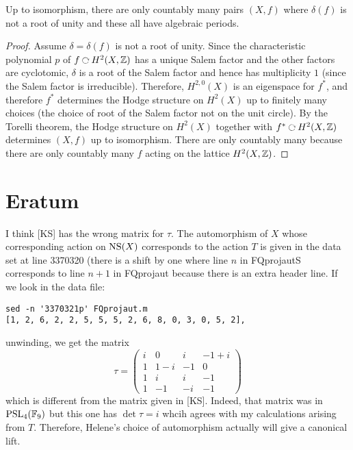 \documentclass[12pt]{article}
\begin{document}
\begin{theorem}
Up to isomorphism, there are only countably many pairs $(X, f)$ where $\delta(f)$ is not a root of unity and these all have algebraic periods.
\end{theorem}

\begin{proof}
Assume $\delta = \delta(f)$ is not a root of unity. Since the characteristic polynomial $p$ of $f \acts H^2(X, \Z)$ has a unique Salem factor and the other factors are cyclotomic, $\delta$ is a root of the Salem factor and hence has multiplicity $1$ (since the Salem factor is irreducible). Therefore, $H^{2,0}(X)$ is an eigenspace for $f^*$, and therefore $f^*$ determines the Hodge structure on $H^2(X)$ up to finitely many choices (the choice of root of the Salem factor not on the unit circle). By the Torelli theorem, the Hodge structure on $H^2(X)$ together with $f^* \acts H^2(X, \Z)$ determines $(X, f)$ up to isomorphism. There are only countably many because there are only countably many $f$ acting on the lattice $H^2(X, \mathbb{Z})$.  
\end{proof}

\section{Eratum}

I think [KS] has the wrong matrix for $\tau$. The automorphism of $X$ whose corresponding action on $\operatorname{\mathrm{NS}}(X)$ corresponds to the action $T$ is given in the data set at line 3370320 (there is a shift by one where line $n$ in FQprojautS corresponds to line $n+1$ in FQprojaut because there is an extra header line. If we look in the data file:
\begin{verbatim}
sed -n '3370321p' FQprojaut.m
[1, 2, 6, 2, 2, 5, 5, 5, 2, 6, 8, 0, 3, 0, 5, 2], 
\end{verbatim}
unwinding, we get the matrix
\[ 
\tau = 
\begin{pmatrix}
i & 0 & i & -1 + i
\\
1 & 1 -i & -1 & 0
\\
1 & i & i & -1
\\
1 & -1 & -i & -1
\end{pmatrix} \]
which is different from the matrix given in [KS]. Indeed, that matrix was in $\mathrm{PSL}_4(\mathbb{F}_9)$ but this one has $\det{\tau} = i$ whcih agrees with my calculations arising from $T$. Therefore, Helene's choice of automorphism actually will give a canonical lift. 
\end{document}
